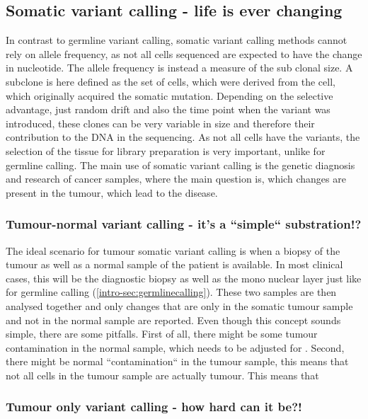 \subsection[Somatic]{Somatic variant calling - life is ever changing}
\label{intro-sec:somaticcalling}
In contrast to germline variant calling, somatic variant calling methods cannot rely on allele frequency, as not all cells sequenced are expected to have the change in nucleotide. The allele frequency is instead a measure of the sub clonal size. A subclone is here defined as the set of cells, which were derived from the cell, which originally acquired the somatic mutation. Depending on the selective advantage, just random drift and also the time point when the variant was introduced, these clones can be very variable in size and therefore their contribution to the DNA in the sequencing.
As not all cells have the variants, the selection of the tissue for library preparation is very important, unlike for germline calling. 
The main use of somatic variant calling is the genetic diagnosis and research of cancer samples, where the main question is, which changes are present in the tumour, which lead to the disease.

\subsubsection[Tumour-normal]{Tumour-normal variant calling - it's a ``simple`` substration!?}
\label{intro-sec:tncalling}
The ideal scenario for tumour somatic variant calling is when a biopsy of the tumour as well as a normal sample of the patient is available. In most clinical cases, this will be the diagnostic biopsy as well as the mono nuclear layer just like for germline calling (\autoref{intro-sec:germlinecalling}). 
These two samples are then analysed together and only changes that are only in the somatic tumour sample and not in the normal sample are reported. Even though this concept sounds simple, there are some pitfalls\cite{GATKTeam2021a}. First of all, there might be some tumour contamination in the normal sample, which needs to be adjusted for \cite{Kim2018,TaylorWeiner2018}. Second, there might be normal ``contamination`` in the tumour sample, this means that not all cells in the tumour sample are actually tumour. This means that

\subsubsection[Tumour only]{Tumour only variant calling - how hard can it be?!}
\label{intro-sec:tocalling}


